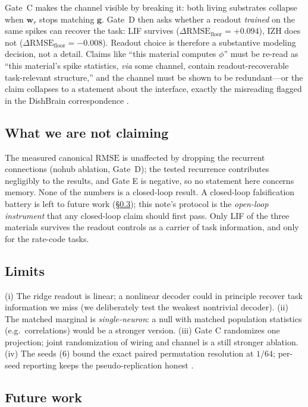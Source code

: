 \documentclass[10pt,a4paper]{article}
\newcommand{\RMSE}{\ensuremath{\mathrm{RMSE}}}
\newcommand{\dfloor}{\ensuremath{\Delta\RMSE_{\mathrm{floor}}}}
\begin{document}
Gate~C makes the channel visible by breaking it: both living
substrates collapse when $\mathbf{w}_r$ stops matching $\mathbf{g}$.
Gate~D then asks whether a readout \emph{trained} on the same spikes
can recover the task: LIF survives ($\dfloor=+0.094$), IZH does not
($\dfloor=-0.008$). Readout choice is therefore a substantive modeling
decision, not a detail. Claims like ``this material computes $\phi$''
must be re-read as ``this material's spike statistics, \emph{via} some
channel, contain readout-recoverable task-relevant structure,'' and the
channel must be shown to be redundant---or the claim collapses to a
statement about the interface, exactly the misreading flagged in the
DishBrain correspondence \cite{balci2023neurons}.

\subsection{What we are not claiming}\label{sec:disc3}

The measured canonical $\RMSE$ is unaffected by dropping the recurrent
connections (nohub ablation, Gate~D); the tested recurrence contributes
negligibly to the results, and Gate E is negative, so no statement here
concerns memory. None of the numbers is a closed-loop result. A
closed-loop falsification battery is left to future work
(\S\ref{sec:disc5}); this note's protocol is the \emph{open-loop
instrument} that any closed-loop claim should first pass. Only LIF of
the three materials survives the readout controls as a carrier of task
information, and only for the rate-code tasks.

\subsection{Limits}\label{sec:disc4}

(i) The ridge readout is linear; a nonlinear decoder could in
principle recover task information we miss (we deliberately test the
weakest nontrivial decoder). (ii) The matched marginal is
\emph{single-neuron}: a null with matched population statistics (e.g.\
correlations) would be a stronger version. (iii) Gate C randomizes one
projection; joint randomization of wiring and channel is a still
stronger ablation. (iv) The seeds ($6$) bound the exact paired
permutation resolution at $1/64$; per-seed reporting keeps the
pseudo-replication honest \cite{hurlbert1984}.

\subsection{Future work}\label{sec:disc5}
\end{document}
